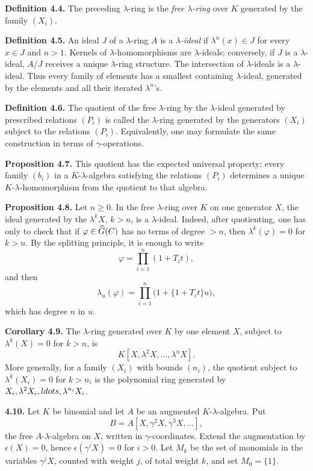 \documentclass[11pt]{article}
\begin{document}
\textbf{Definition 4.4.} The preceding \(\lambda\)-ring is the \emph{free \(\lambda\)-ring} over \(K\) generated by the family \((X_i)\).

\textbf{Definition 4.5.} An ideal \(J\) of a \(\lambda\)-ring \(A\) is a \emph{\(\lambda\)-ideal} if \(\lambda^n(x)\in J\) for every \(x\in J\) and \(n>1\). Kernels of \(\lambda\)-homomorphisms are \(\lambda\)-ideals; conversely, if \(J\) is a \(\lambda\)-ideal, \(A/J\) receives a unique \(\lambda\)-ring structure. The intersection of \(\lambda\)-ideals is a \(\lambda\)-ideal. Thus every family of elements has a smallest containing \(\lambda\)-ideal, generated by the elements and all their iterated \(\lambda^n\)'s.

\textbf{Definition 4.6.} The quotient of the free \(\lambda\)-ring by the \(\lambda\)-ideal generated by prescribed relations \((P_i)\) is called the \(\lambda\)-ring generated by the generators \((X_i)\) subject to the relations \((P_i)\). Equivalently, one may formulate the same construction in terms of \(\gamma\)-operations.

\textbf{Proposition 4.7.} This quotient has the expected universal property: every family \((b_i)\) in a \(K\)-\(\lambda\)-algebra satisfying the relations \((P_i)\) determines a unique \(K\)-\(\lambda\)-homomorphism from the quotient to that algebra.

\textbf{Proposition 4.8.} Let \(n\ge0\). In the free \(\lambda\)-ring over \(K\) on one generator \(X\), the ideal generated by the \(\lambda^kX\), \(k>n\), is a \(\lambda\)-ideal. Indeed, after quotienting, one has only to check that if \(\varphi\in\widehat G(C)\) has no terms of degree \(>n\), then \(\lambda^k(\varphi)=0\) for \(k>n\). By the splitting principle, it is enough to write
\[
  \varphi=\prod_{i=1}^{n}(1+T_it),
\]
and then
\[
  \lambda_u(\varphi)=\prod_{i=1}^{n}\bigl(1+\{1+T_it\}u\bigr),
\]
which has degree \(n\) in \(u\).

\textbf{Corollary 4.9.} The \(\lambda\)-ring generated over \(K\) by one element \(X\), subject to \(\lambda^k(X)=0\) for \(k>n\), is
\[
  K[X,\lambda^2X,\ldots,\lambda^nX].
\]
More generally, for a family \((X_i)\) with bounds \((n_i)\), the quotient subject to \(\lambda^k(X_i)=0\) for \(k>n_i\) is the polynomial ring generated by \(X_i,\lambda^2X_i,\\ldots,\lambda^{n_i}X_i\).

\textbf{4.10.} Let \(K\) be binomial and let \(A\) be an augmented \(K\)-\(\lambda\)-algebra. Put
\[
  B=A[X,\gamma^2X,\gamma^3X,\ldots],
\]
the free \(A\)-\(\lambda\)-algebra on \(X\), written in \(\gamma\)-coordinates. Extend the augmentation by \(\epsilon(X)=0\), hence \(\epsilon(\gamma^iX)=0\) for \(i>0\). Let \(M_k\) be the set of monomials in the variables \(\gamma^jX\), counted with weight \(j\), of total weight \(k\), and set \(M_0=\{1\}\).
\end{document}
